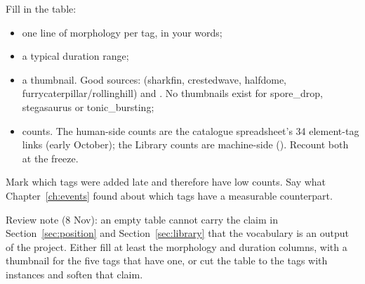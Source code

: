 \begin{instructions}
Fill in the table:
\begin{itemize}
  \item one line of morphology per tag, in your words;
  \item a typical duration range;
  \item a thumbnail. Good sources:  (sharkfin, crestedwave, halfdome,
        furrycaterpillar/rollinghill) and . No thumbnails exist for spore\_drop, stegasaurus or
        tonic\_bursting;
  \item counts. The human-side counts are the catalogue spreadsheet's 34 element-tag links (early October); the Library
        counts are machine-side (). Recount both at the freeze.
\end{itemize}
Mark which tags were added late and therefore have low counts. Say what Chapter~\ref{ch:events} found about which tags
have a measurable counterpart.

Review note (8 Nov): an empty table cannot carry the claim in Section~\ref{sec:position} and Section~\ref{sec:library}
that the vocabulary is an output of the project. Either fill at least the morphology and duration columns, with a
thumbnail for the five tags that have one, or cut the table to the tags with instances and soften that claim.
\end{instructions}
